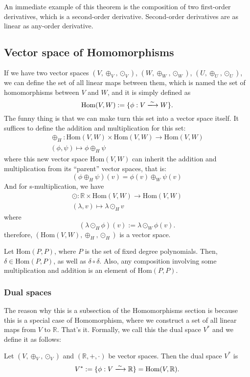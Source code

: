 An immediate example of this theorem is the composition of two first-order derivatives, which is a second-order derivative. Second-order derivatives are as linear as any-order derivative.

\subsection{Vector space of Homomorphisms}
If we have two vector spaces $(V, \oplus_V, \odot_V)$, $(W, \oplus_W, \odot_W)$, $(U, \oplus_U, \odot_U)$, we can define the set of all linear maps between them, which is named the set of homomorphisms between $V$ and $W$, and it is simply defined as
\[
    \text{Hom}(V,W) := \{\phi : V \xlongrightarrow[]{\sim} W\}.
\]
The funny thing is that we can make turn this set into a vector space itself. It suffices to define the addition and multiplication for this set:
\begin{align*}
    \oplus_H : \text{Hom}(V,W) \times \text{Hom}(V,W) \longrightarrow \text{Hom}(V,W) \\
    (\phi, \psi) \longmapsto \phi \oplus_H \psi
\end{align*}
where this new vector space $\text{Hom}(V,W)$ can inherit the addition and multiplication from its ``parent'' vector spaces, that is: 
\[
    (\phi \oplus_H \psi)(v) = \phi(v) \oplus_W \psi(v)
\]
And for s-multiplication, we have
\begin{align*}
    \odot : \mathbb{R} \times \text{Hom}(V,W) \longrightarrow \text{Hom}(V,W) \\
    (\lambda,v) \longmapsto \lambda \odot_H v
\end{align*}
where
\[
    (\lambda \odot_H \phi)(v) := \lambda \odot_W \phi(v).
\]
therefore, $(\text{Hom}(V,W), \oplus_H, \odot_H)$ is a vector space. 

\begin{example}
    Let $\text{Hom}(P,P)$, where $P$ is the set of fixed degree polynomials. Then, $\delta \in \text{Hom}(P,P)$, as well as $\delta \circ \delta$. Also, any composition involving some multiplication and addition is an element of $\text{Hom}(P,P)$.
    \qedwhite
\end{example}

\subsubsection{Dual spaces}
The reason why this is a subsection of the Homomorphisms section is because this is a special case of Homomorphism, where we construct a set of all linear maps from $V$ to $\mathbb{R}$. That's it. Formally, we call this the dual space $V^*$ and we define it as follows:
\begin{definition}
    Let $(V, \oplus_V, \odot_V)$ and $(\mathbb{R}, +, \cdot)$ be vector spaces. Then the dual space $V^*$ is
    \[
        V^* : = \{ \phi : V \xlongrightarrow[]{\sim} \mathbb{R} \} = \text{Hom}(V,\mathbb{R}).
    \]
\end{definition}

